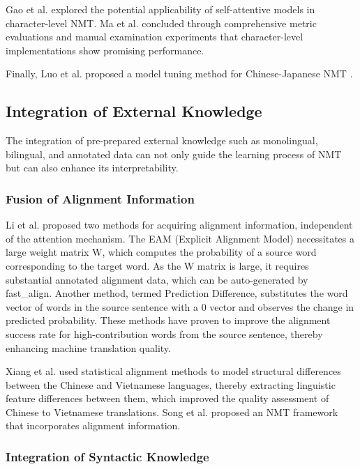 \documentclass[acmsmall]{acmart}
\begin{document}
Gao et al. \cite{n4-39} explored the potential applicability of self-attentive models in character-level NMT. Ma et al. \cite{n4-40} concluded through comprehensive metric evaluations and manual examination experiments that character-level implementations show promising performance.

Finally, Luo et al. proposed a model tuning method for Chinese-Japanese NMT \cite{4-2-12}.




\subsection{Integration of External Knowledge}

The integration of pre-prepared external knowledge such as monolingual, bilingual, and annotated data can not only guide the learning process of NMT but can also enhance its interpretability.

\subsubsection{Fusion of Alignment Information}

Li et al. \cite{n4-42} proposed two methods for acquiring alignment information, independent of the attention mechanism. The EAM (Explicit Alignment Model) necessitates a large weight matrix W, which computes the probability of a source word corresponding to the target word. As the W matrix is large, it requires substantial annotated alignment data, which can be auto-generated by fast\_align. Another method, termed Prediction Difference, substitutes the word vector of words in the source sentence with a 0 vector and observes the change in predicted probability. These methods have proven to improve the alignment success rate for high-contribution words from the source sentence, thereby enhancing machine translation quality.

Xiang et al. \cite{n4-43} used statistical alignment methods to model structural differences between the Chinese and Vietnamese languages, thereby extracting linguistic feature differences between them, which improved the quality assessment of Chinese to Vietnamese translations. Song et al. \cite{n4-44} proposed an NMT framework that incorporates alignment information.

\subsubsection{Integration of Syntactic Knowledge}
\end{document}

